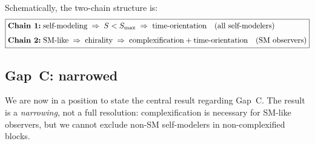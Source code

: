 Schematically, the two-chain structure is:
\begin{equation}
\boxed{
\begin{aligned}
  &\textbf{Chain 1:}\;
  \text{self-modeling}
  \;\Rightarrow\;
  S < S_{\max}
  \;\Rightarrow\;
  \text{time-orientation}
  \quad\text{(all self-modelers)}\\[4pt]
  &\textbf{Chain 2:}\;
  \text{SM-like}
  \;\Rightarrow\;
  \text{chirality}
  \;\Rightarrow\;
  \text{complexification} + \text{time-orientation}
  \quad\text{(SM observers)}
\end{aligned}
}
\label{eq:selection-chain}
\end{equation}

\subsection{Gap~C: narrowed}\label{sec:gapc-theorem}

We are now in a position to state the central result regarding
Gap~C\@.  The result is a \emph{narrowing}, not a full resolution:
complexification is necessary for SM-like observers, but we cannot
exclude non-SM self-modelers in non-complexified blocks.

